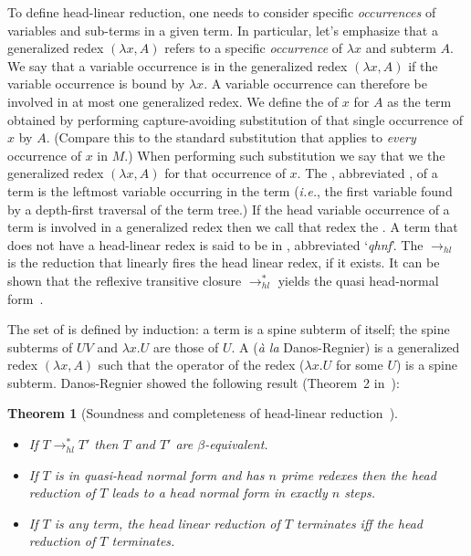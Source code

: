 \documentclass{elsarticle}
\makeatletter
\theoremstyle{plain}
\newtheorem{theorem}{Theorem}[section]
\theoremstyle{definition}
\renewcommand\ie{{\it i.e.\@\xspace}}
\newcommand{\hlred}{\rightarrow_{hl}}
\makeatother
\begin{document}
To define head-linear reduction, one needs to consider specific \emph{occurrences} of variables and sub-terms in a given term. In particular, let's emphasize that a generalized redex  $(\lambda x, A)$ refers to a specific \emph{occurrence} of $\lambda x$ and subterm $A$.
%
We say that a variable occurrence is  in the generalized redex $(\lambda x, A)$ if the variable occurrence is bound by $\lambda x$. A variable occurrence can therefore be involved in at most one generalized redex. We define the  of $x$ for $A$ as the term obtained by performing capture-avoiding substitution of that single occurrence of $x$ by $A$. (Compare this to the standard substitution that applies to \emph{every} occurrence of $x$ in $M$.) When performing such substitution we say that we  the generalized redex $(\lambda x, A)$ for that occurrence of $x$.
%
The , abbreviated , of a term is the leftmost variable occurring in the term (\ie, the first variable found by a depth-first traversal of the term tree.) If the head variable occurrence of a term is involved in a generalized redex then we call that redex the .
A term that does not have a head-linear redex is said to be in , abbreviated `\emph{qhnf}'.
The  $\hlred$ is the reduction that linearly fires the head linear redex, if it exists. It can be shown that the reflexive transitive closure $\rightarrow^*_{hl}$ yields the quasi head-normal form~\cite{danos-head,danosherbelinregnier1996}.

The set of  is defined by induction: a term is a spine subterm of itself; the spine subterms of $U V$ and $\lambda x. U$ are those of $U$.
A  ({\it \`a la} Danos-Regnier) is a generalized redex $(\lambda x, A)$ such that the operator of the redex ($\lambda x . U$ for some $U$) is a spine subterm. Danos-Regnier showed the following result (Theorem~2 in~\cite{danos-head}):
\begin{theorem}[Soundness and completeness of head-linear reduction~\cite{danos-head}] \
\label{thm:danosregnier_headlinred}
\begin{itemize}[nosep]
\item If $T \rightarrow^*_{hl} T'$  then $T$ and $T'$ are $\beta$-equivalent.
\item If $T$ is in quasi-head normal form and has $n$ prime redexes then the head reduction of $T$ leads to a head normal form in exactly $n$ steps.
\item If $T$ is any term, the head linear reduction of $T$ terminates iff the head reduction of $T$ terminates.
\end{itemize}
\end{theorem}
\end{document}
